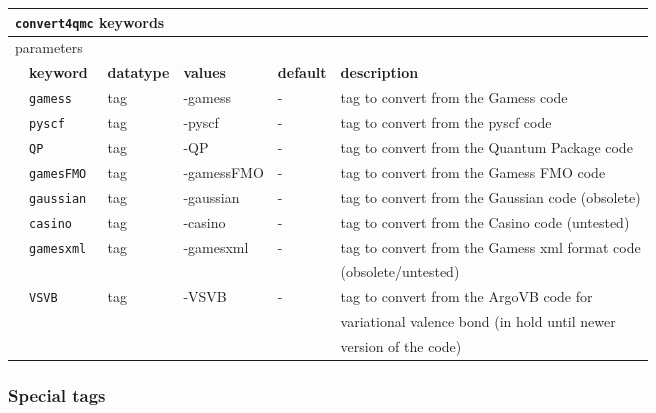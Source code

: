 \begin{table}[h]
\begin{center}
\begin{tabularx}{\textwidth}{l l l l l l }
\hline
\multicolumn{6}{l}{\texttt{convert4qmc} keywords} \\
\hline
\multicolumn{2}{l}{parameters}  & \multicolumn{4}{l}{}\\
   &   \bfseries keyword     & \bfseries datatype & \bfseries values & \bfseries default   & \bfseries description \\
   &   \texttt{gamess             } &  tag  & -gamess & -   & tag to convert from the Gamess code\\
   &   \texttt{pyscf             } &  tag  & -pyscf & -   & tag to convert from the pyscf code\\
   &   \texttt{QP             } &  tag  & -QP & -   & tag to convert from the Quantum Package code\\
   &   \texttt{gamesFMO             } &  tag  & -gamessFMO & -   & tag to convert from the Gamess FMO code\\
   &   \texttt{gaussian             } &  tag  & -gaussian & -   & tag to convert from the Gaussian code (obsolete) \\
   &   \texttt{casino             } &  tag  & -casino & -   & tag to convert from the Casino code (untested)\\
   &   \texttt{gamesxml             } &  tag  & -gamesxml & -   & tag to convert from the Gamess xml format code\\ &&&&&  (obsolete/untested)\\
   &   \texttt{VSVB             } &  tag  & -VSVB & -   & tag to convert from the ArgoVB code for \\ &&&&&variational valence bond  (in hold until newer\\ &&&&& version of the code)\\
    \hline

    \end{tabularx}
\end{center}
\end{table}

\subsubsection{Special tags}


